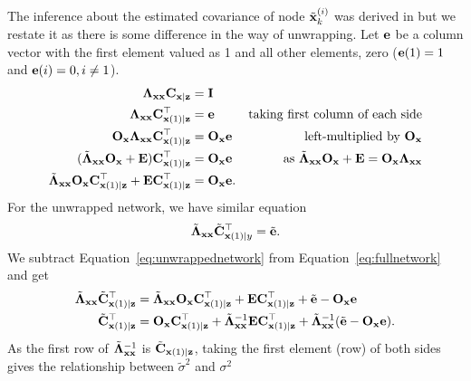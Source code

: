 The inference about the estimated covariance of node $\tilde{\bf x}^{(i)}_{k}$ was derived in \cite{Weiss1999} but we restate it as there is some difference in the way of unwrapping.
Let $\bf e$ be a column vector with the first element valued as 1 and all other elements, zero (${\bf e}(1)=1$ and ${\bf e}(i)=0,i\neq 1$).
\begin{align}
{\bf \Lambda}_{\bf xx}{\bf C}_{\bf x|z}&={\bf I} &  \\
{\bf \Lambda}_{\bf xx}{\bf C}_{{\bf x}(1)|{\bf z}}^\top&={\bf e} & \textrm{taking first column of each side} \\
{\bf O}_{\bf x}{\bf \Lambda}_{\bf xx}{\bf C}_{{\bf x}(1)|{\bf z}}^\top&={\bf O}_{\bf x}{\bf e}  & \textrm{left-multiplied by ${\bf O}_{\bf x}$}\\
({\tilde{\bf \Lambda}}_{\bf xx}{\bf O}_{\bf x}+{\bf E}){\bf C}_{{\bf x}(1)|{\bf z}}^\top&={\bf O}_{\bf x}{\bf e}  & \textrm{as ${\tilde{\bf \Lambda}}_{\bf xx}{\bf O}_{\bf x}+{\bf E}={\bf O}_{\bf x}{\bf \Lambda}_{\bf xx}$}\\
{\tilde{\bf \Lambda}}_{\bf xx}{\bf O}_{\bf x}{\bf C}_{{\bf x}(1)|{\bf z}}^\top+{\bf E}{\bf C}_{{\bf x}(1)|{\bf z}}^\top&={\bf O}_{\bf x}{\bf e}.  &\label{eq:fullnetwork}
\end{align}
For the unwrapped network, we have similar equation
\begin{equation} \label{eq:unwrappednetwork}
\tilde{\bf \Lambda}_{\bf xx}\tilde{\bf C}_{{\bf x}(1)|y}^\top=\tilde{\bf e}.
\end{equation}
We subtract Equation~\eqref{eq:unwrappednetwork} from Equation~\eqref{eq:fullnetwork} and get
\begin{equation}
\begin{split}
\tilde{\bf \Lambda}_{\bf xx}\tilde{\bf C}_{{\bf x}(1)|{\bf z}}^\top&={\tilde{\bf \Lambda}}_{\bf xx}{\bf O}_{\bf x}{\bf C}_{{\bf x}(1)|{\bf z}}^\top+{\bf E}{\bf C}_{{\bf x}(1)|{\bf z}}^\top+\tilde{\bf e}-{\bf O}_{\bf x}{\bf e} \\
\tilde{\bf C}_{{\bf x}(1)|{\bf z}}^\top&={\bf O}_{\bf x}{\bf C}_{{\bf x}(1)|{\bf z}}^\top+\tilde{\bf \Lambda}_{\bf xx}^{-1}{\bf E}{\bf C}_{{\bf x}(1)|{\bf z}}^\top+\tilde{\bf \Lambda}_{\bf xx}^{-1}(\tilde{\bf e}-{\bf O}_{\bf x}{\bf e}). \\
\end{split}
\end{equation}
As the first row of $\tilde{\bf \Lambda}_{\bf xx}^{-1}$ is $\tilde{\bf C}_{{\bf x}(1)|{\bf z}}$, taking the first element (row) of both sides gives the relationship between $\tilde\sigma^2$ and $\sigma^2$
